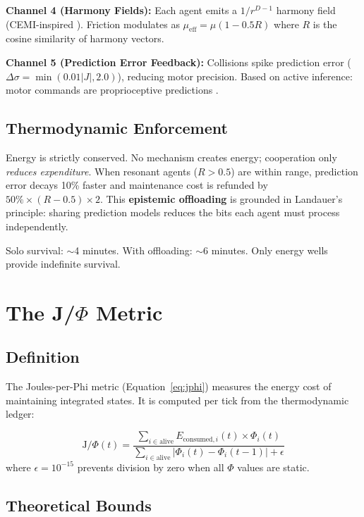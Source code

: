 \documentclass[entropy,article]{Definitions/mdpi}
\begin{document}
\textbf{Channel 4 (Harmony Fields):} Each agent emits a $1/r^{D-1}$ harmony field (CEMI-inspired \citep{mcfadden2020}). Friction modulates as $\mu_{\text{eff}} = \mu(1 - 0.5R)$ where $R$ is the cosine similarity of harmony vectors.

\textbf{Channel 5 (Prediction Error Feedback):} Collisions spike prediction error ($\Delta\sigma = \min(0.01|J|, 2.0)$), reducing motor precision. Based on active inference: motor commands are proprioceptive predictions \citep{adams2013}.

\subsection{Thermodynamic Enforcement}

Energy is strictly conserved. No mechanism creates energy; cooperation only \emph{reduces expenditure}. When resonant agents ($R > 0.5$) are within range, prediction error decays 10\% faster and maintenance cost is refunded by $50\% \times (R - 0.5) \times 2$. This \textbf{epistemic offloading} is grounded in Landauer's principle: sharing prediction models reduces the bits each agent must process independently.

Solo survival: $\sim$4 minutes. With offloading: $\sim$6 minutes. Only energy wells provide indefinite survival.

\section{The J/$\Phi$ Metric}
\label{sec:metric}

\subsection{Definition}

The Joules-per-Phi metric (Equation~\ref{eq:jphi}) measures the energy cost of maintaining integrated states. It is computed per tick from the thermodynamic ledger:

\begin{equation}
\text{J}/\Phi(t) = \frac{\sum_{i \in \text{alive}} E_{\text{consumed},i}(t) \times \Phi_i(t)}{\sum_{i \in \text{alive}} |\Phi_i(t) - \Phi_i(t-1)| + \epsilon}
\end{equation}
where $\epsilon = 10^{-15}$ prevents division by zero when all $\Phi$ values are static.

\subsection{Theoretical Bounds}
\end{document}
